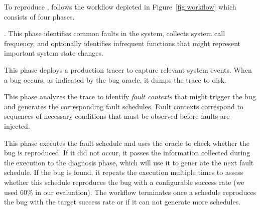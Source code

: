 To reproduce \efibshort, \sys follows the workflow depicted in Figure~\ref{fig:workflow} which consists of four phases.

. This phase identifies common faults in the system, collects system call frequency, and optionally identifies infrequent functions that might represent important system state changes.

 This phase deploys a production tracer to capture relevant system events.
When a bug occurs, as indicated by the bug oracle, it dumps the trace to disk.

 This phase analyzes the trace to identify \emph{fault contexts} that might trigger the bug and generates the corresponding fault schedules.
Fault contexts correspond to sequences of necessary conditions that must be observed before faults are injected.

 This phase executes the fault schedule and uses the oracle to check whether the bug is reproduced.
If it did not occur, it passes the information collected during the execution to the diagnosis phase, which will use it to gener ate the next fault schedule.
If the bug is found, it repeats the execution multiple times to assess whether this schedule reproduces the bug with a configurable success rate (we used 60\% in our evaluation).
The workflow terminates once a schedule reproduces the bug with the target success rate or if it can not generate more schedules.




